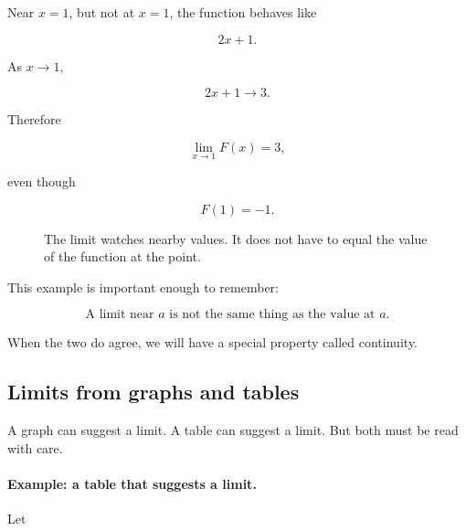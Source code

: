 Near \(x=1\), but not at \(x=1\), the function behaves like

\[
2x+1.
\]

As \(x\to1\),

\[
2x+1\to3.
\]

Therefore

\[
\lim_{x\to1}F(x)=3,
\]

even though

\[
F(1)=-1.
\]

\begin{figure}[h]
\centering
{}
\caption{The limit watches nearby values.  It does not have to equal the value of the function at the point.}
\label{fig:limit-hole-different-value}
\end{figure}

This example is important enough to remember:

\[
\boxed{\text{A limit near \(a\) is not the same thing as the value at \(a\).}}
\]

When the two do agree, we will have a special property called continuity.

\subsection{Limits from graphs and tables}
\label{subsec:limits-graphs-tables}

A graph can suggest a limit.  A table can suggest a limit.  But both must be read with care.

\paragraph{Example: a table that suggests a limit.}
Let

